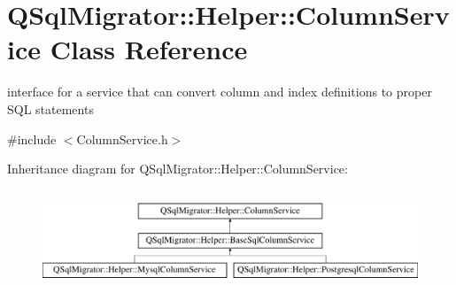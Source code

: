 \hypertarget{class_q_sql_migrator_1_1_helper_1_1_column_service}{}\section{Q\+Sql\+Migrator\+:\+:Helper\+:\+:Column\+Service Class Reference}
\label{class_q_sql_migrator_1_1_helper_1_1_column_service}


interface for a service that can convert column and index definitions to proper S\+QL statements  




{\ttfamily \#include $<$Column\+Service.\+h$>$}

Inheritance diagram for Q\+Sql\+Migrator\+:\+:Helper\+:\+:Column\+Service\+:\begin{figure}[H]
\begin{center}
\leavevmode
\includegraphics[height=2.906574cm]{class_q_sql_migrator_1_1_helper_1_1_column_service}
\end{center}
\end{figure}
